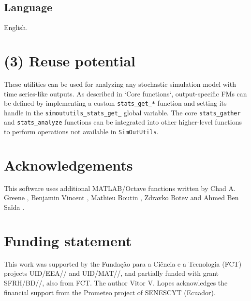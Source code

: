 \documentclass{article}
\newcommand{\progfunc}{\textnhtt}
\newcommand{\progvar}{\textnhtt}
\newcommand{\swpackage}{\texttt}
\begin{document}
\subsection*{Language}
English.

\section*{(3) Reuse potential}

These utilities can be used for analyzing any stochastic simulation model with time series-like outputs. As described in `Core functions`, output-specific FMs can be defined by implementing a custom \progfunc{stats\_get\_*} function and setting its handle in the \progvar{simoututils\_stats\_get\_} global variable. The core \progfunc{stats\_gather} and \progfunc{stats\_analyze} functions can be integrated into other higher-level functions to perform operations not available in \swpackage{SimOutUtils}.

\section*{Acknowledgements}

This software uses additional MATLAB/Octave functions written by Chad A. Greene \cite{greene2013figtitle}, Benjamin Vincent \cite{vincent2014fill}, Mathieu Boutin \cite{boutin2011homemade}, Zdravko Botev \cite{botev2010kernel} and Ahmed Ben Sa{\"i}da \cite{saida2007shapiro}.

\section*{Funding statement}

This work was supported by the Fundação para a Ciência e a Tecnologia (FCT) projects UID/\allowbreak EEA// and UID/\allowbreak MAT//, and partially funded with grant SFRH/\allowbreak BD//, also from FCT. The author Vitor V. Lopes acknowledges the financial support from the Prometeo project of SENESCYT (Ecuador).
\end{document}
